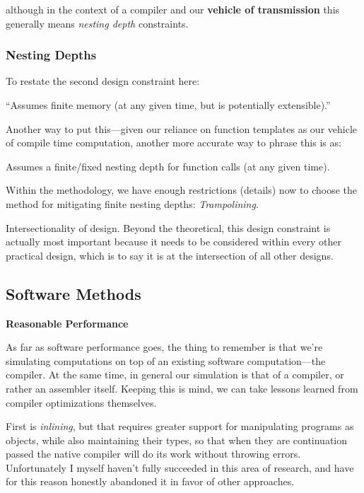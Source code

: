 \documentclass[twoside]{article}
\newcommand{\strong}[1]{{\bfseries #1}}
\begin{document}
although in the context of a compiler and our \strong{vehicle of transmission} this generally means \emph{nesting depth} constraints.

\subsubsection*{Nesting Depths}

To restate the second design constraint here:

\begin{center}
``Assumes finite memory (at any given time, but is potentially extensible).''
\end{center}

Another way to put this---given our reliance on function templates as our vehicle of compile time computation,
another more accurate way to phrase this is as:

\begin{center}
Assumes a finite/fixed nesting depth for function calls (at any given time).
\end{center}

Within the methodology, we have enough restrictions (details) now to choose the method for mitigating finite
nesting depths: \emph{Trampolining}.

Intersectionality of design. Beyond the theoretical, this design constraint is actually most important because
it needs to be considered within every other practical design, which is to say it is at the intersection of all
other designs.

\subsection*{Software Methods}

\strong{Reasonable Performance}

As far as software performance goes, the thing to remember is that we're simulating computations on top of
an existing software computation---the compiler. At the same time, in general our simulation is that of a compiler,
or rather an assembler itself. Keeping this is mind, we can take lessons learned from compiler optimizations themselves.

First is \emph{inlining}, but that requires greater support for manipulating programs as objects, while also maintaining
their types, so that when they are continuation passed the native compiler will do its work without throwing errors.
Unfortunately I myself haven't fully succeeded in this area of research, and have for this reason honestly abandoned
it in favor of other approaches.
\end{document}
